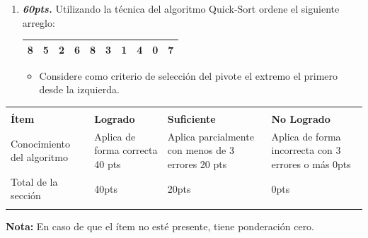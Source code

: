 \documentclass{exam}
\begin{document}
\begin{enumerate}
\begin{questions}

  \begin{enumerate}
  \item \textbf{\emph{60pts.}} Utilizando la técnica del algoritmo Quick-Sort ordene el siguiente arreglo:

  \begin{table}[H]
  \centering
  \begin{tabular}{|l|l|l|l|l|l|l|l|l|l|}
  \hline
    8 & 5 & 2 & 6 & 8 & 3 & 1 & 4 & 0 & 7 \\
  \hline
  \end{tabular}
  \end{table}

\begin{itemize}
  \item Considere como criterio de selección del pivote el extremo el primero desde la izquierda.
\end{itemize}

    \end{enumerate}
  \end{questions}

  \begin{table}[H]
    \centering
    \begin{tabular}{
      !{\color{gray!50}\vrule}p{3.9cm}
      !{\color{gray!50}\vrule}p{3.6cm}
      !{\color{gray!50}\vrule}p{3.6cm}
      !{\color{gray!50}\vrule}p{3.6cm}
      !{\color{gray!50}\vrule}}  \hline
       \\  \hline
      \textbf{Ítem} & \textbf{Logrado} & \textbf{Suficiente} & \textbf{No Logrado}\\  \hline
      Conocimiento del algoritmo &
      Aplica de forma correcta 40 pts   &
      Aplica parcialmente con menos de 3 errores 20 pts  &
      Aplica de forma incorrecta con 3 errores o más 0pts\\  \hline


      Total de la sección &  40pts & 20pts & 0pts\\  \hline
    \end{tabular}
    \label{tbl:1}
  \end{table}
  \vspace{-5mm}
  \textbf{Nota:} En caso de que el {í}tem no est{é} presente, tiene ponderaci{ó}n cero.


\end{enumerate}
\end{document}
